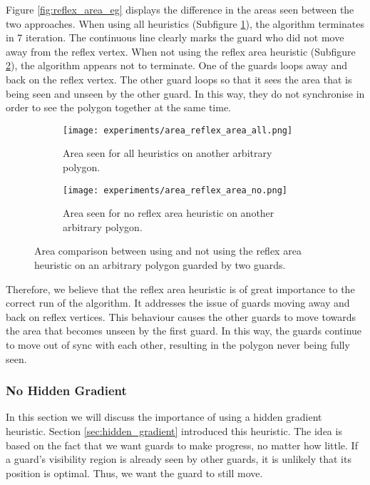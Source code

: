 Figure \ref{fig:reflex_area_eg} displays the difference in the areas seen between the two approaches. When using all heuristics (Subfigure \ref{fig:area_reflex_area_all}), the algorithm terminates in 7 iteration. The continuous line clearly marks the guard who did not move away from the reflex vertex. When not using the reflex area heuristic (Subfigure \ref{fig:area_reflex_area_no}), the algorithm appears not to terminate. One of the guards loops away and back on the reflex vertex. The other guard loops so that it sees the area that is being seen and unseen by the other guard. In this way, they do not synchronise in order to see the polygon together at the same time.

\begin{figure}[h!]
    \centering
    \begin{subfigure}{0.45\textwidth}
        \texttt{[image: experiments/area\_reflex\_area\_all.png]}
        \caption{Area seen for all heuristics on another arbitrary polygon.}
        \label{fig:area_reflex_area_all}
    \end{subfigure}
    \hfill
    \begin{subfigure}{0.45\textwidth}
        \texttt{[image: experiments/area\_reflex\_area\_no.png]}
        \caption{Area seen for no reflex area heuristic on another arbitrary polygon.}
        \label{fig:area_reflex_area_no}
    \end{subfigure}
    \caption{Area comparison between using and not using the reflex area heuristic on an arbitrary polygon guarded by two guards.}
    \label{fig:area_reflex_area}
\end{figure}

Therefore, we believe that the reflex area heuristic is of great importance to the correct run of the algorithm. It addresses the issue of guards moving away and back on reflex vertices. This behaviour causes the other guards to move towards the area that becomes unseen by the first guard. In this way, the guards continue to move out of sync with each other, resulting in the polygon never being fully seen.

\subsubsection{No Hidden Gradient}
In this section we will discuss the importance of using a hidden gradient heuristic. Section \ref{sec:hidden_gradient} introduced this heuristic. The idea is based on the fact that we want guards to make progress, no matter how little. If a guard's visibility region is already seen by other guards, it is unlikely that its position is optimal. Thus, we want the guard to still move.

